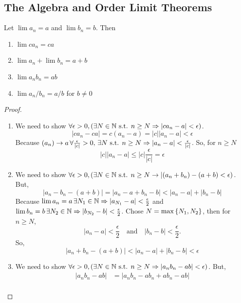 \subsection{The Algebra and Order Limit Theorems}
\begin{thm}{}{\label{thm:aolt}}
    Let $\lim a_n = a$ and $\lim b_n = b$. Then 
    \begin{enumerate}
        \item $\lim ca_n = ca$ 
        \item $\lim a_n + \lim b_n = a + b$
        \item $\lim a_n b_n = ab$ 
        \item $\lim a_n/b_n = a/b$ for $b \neq 0$
    \end{enumerate}

    \begin{proof}
        \begin{enumerate}
            \item We need to show $\forall \epsilon > 0, (\exists N \in \mathbb N \text{ s.t. } n \geq N \Rightarrow |ca_n - a| < \epsilon)$.
                \[
                    |ca_n - ca| = c(a_n - a) = |c||a_n - a| < \epsilon 
                \]
            Because $(a_n) \to a \, \forall \frac{\epsilon}{|c|} > 0, \, \exists N \text{ s.t. } n \geq N \Rightarrow |a_n - a| < \frac{\epsilon}{|c|}$. So, for $n \geq N$
            \[
                |c||a_n - a| \leq |c|\frac{\epsilon}{|c|} = \epsilon 
            \]
            \item We need to show $\forall \epsilon > 0, (\exists N \in \mathbb N \text{ s.t. } n \geq N \rightarrow |(a_n + b_n) - (a + b) < \epsilon)$. But, 
            \[
                |a_n - b_n - (a + b)| = |a_n - a + b_n - b| < |a_n - a| + |b_n - b|
            \]
            Because $\lim a_n = a\, \exists N_1 \in \mathbb N \Rightarrow |a_{N_1} - a | < \frac{\epsilon}{2}$ and $\lim b_n = b\, \exists N_2 \in \mathbb N \Rightarrow |b_{N_2} - b| < \frac{\epsilon}{2}$. Chose $N = \max\left\{N_{1}, N_{2} \right\}$, then for $n \geq N$, 
            \[
                |a_n - a| < \frac{\epsilon}{2} \quad\text{and}\quad |b_n - b| < \frac{\epsilon}{2}. 
            \]
            So, 
            \[
                |a_n + b_n - (a + b)| < |a_n - a| + |b_n - b| < \epsilon
            \]
            \item We need to show $\forall \epsilon > 0, (\exists N \in \mathbb N \text{ s.t. } n \geq N \Rightarrow |a_n b_n - ab| < \epsilon)$. But, 
            \begin{align*}
                |a_n b_n - ab| &= |a_n b_n - ab_n + ab_n - ab| \\

\end{align*}
\end{enumerate}
\end{proof}
\end{thm}
